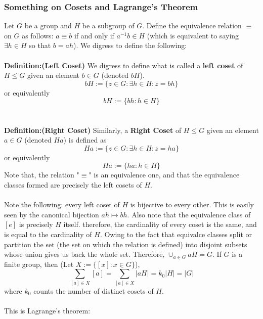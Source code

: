 \documentclass[../Main.tex]{subfiles}
\begin{document}
\subsubsection{Something on Cosets and Lagrange's Theorem}
Let $G$ be a group and $H$ be a subgroup of $G$. Define the equivalence relation $\equiv$ on $G$ as follows: $a \equiv b$ if and only if $a^{-1}b \in H$ (which is equivalent to saying $\exists h \in H$ so that $b=ah$). We digress to define the following:
\\\\ \textbf{Definition:(Left Coset)} We digress to define what is called a \textbf{left coset} of $H\leq G$ given an element $b \in G$ (denoted $bH$). $$bH:=\{z\in G: \exists h \in H: z=bh\}$$ or equivalently $$bH:=\{bh:h\in H\}$$
\\\\ \textbf{Definition:(Right Coset)} Similarly, a \textbf{Right Coset} of $H \leq G$ given an element $a \in G$ (denoted $Ha$) is defined as $$Ha:=\{z \in G: \exists h \in H: z=ha\} $$ or equivalently $$Ha:=\{ha: h \in H\} $$
Note that, the relation "$\equiv$" is an equivalence one, and that the equivalence classes formed are precisely the left cosets of $H$.
\\\\ Note the following: every left coset of $H$ is bijective to every other. This is easily seen by the canonical bijection $ah \mapsto bh$. Also note that the equivalence class of $[e]$ is precisely $H$ itself. therefore, the cardinality of every coset is the same, and is equal to the cardinality of $H$. Owing to the fact that equivalce classes split or partition the set (the set on which the relation is defined) into disjoint subsets whose union gives us back the whole set. Therefore, $\cup_{a \in G} aH=G$. If $G$ is a finite group, then (Let $X:=\{[x]: x \in G\}$), $$\sum_{[a]\in X} [a]=\sum_{[a]\in X} |aH|=k_0|H|=|G|$$ where $k_0$ counts the number of distinct cosets of $H$.  
\\\\ This is Lagrange's theorem:
\end{document}
